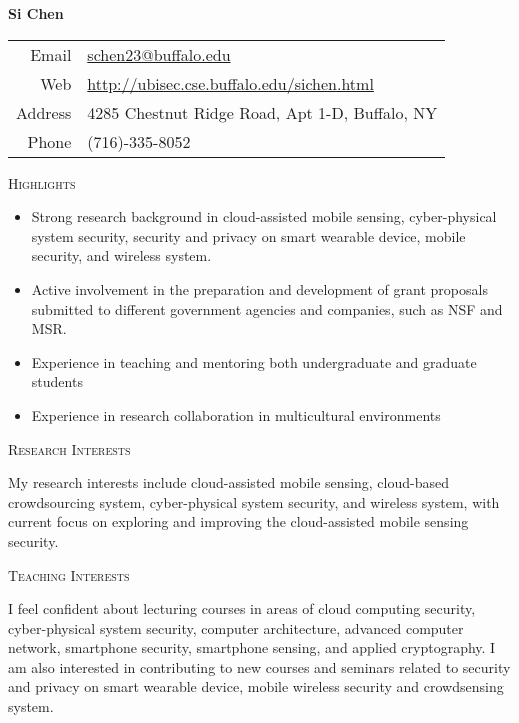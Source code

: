 \documentclass[letter]{article}
\newcommand{\heading}[1]{\item \large \textsc{#1} \normalsize}
\begin{document}
\Huge \textbf{Si Chen} \hfill \small
\begin{tabular}{rl}
Email   & \href{mailto:schen23@buffalo.edu}{schen23@buffalo.edu} \\
Web     & \url{http://ubisec.cse.buffalo.edu/sichen.html} \\
Address & 4285 Chestnut Ridge Road, Apt 1-D, Buffalo, NY\\
Phone  & (716)-335-8052\\
\end{tabular}

\normalsize

\begin{description}

\heading{Highlights}
\begin{itemize}
\item Strong research background in  cloud-assisted mobile sensing, cyber-physical system security, security and privacy on smart wearable device, mobile security, and wireless system.

\item Active involvement in the preparation and development of grant proposals submitted to different government agencies and companies, such as NSF and MSR.
\item Experience in teaching and mentoring both undergraduate and graduate students
\item Experience in research collaboration in multicultural environments
\end{itemize}


\heading{Research Interests}

My research interests include cloud-assisted mobile sensing, cloud-based crowdsourcing system, cyber-physical system security, and wireless system,  with current focus on exploring and improving the cloud-assisted mobile sensing security. \\

\heading{Teaching Interests}

I feel confident about lecturing courses in areas of cloud computing security, cyber-physical system security, computer architecture, advanced computer network, smartphone security, smartphone sensing, and applied cryptography. I am also interested in contributing to new courses and seminars related to security and privacy on smart wearable device, mobile wireless security and crowdsensing system.




\end{description}
\end{document}
